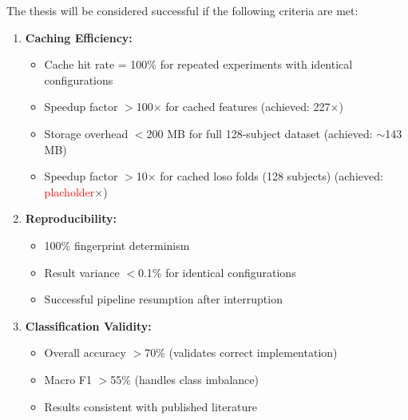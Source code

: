 The thesis will be considered successful if the following criteria are met:

\begin{enumerate}
\item \textbf{Caching Efficiency:}
  \begin{itemize}
  \item Cache hit rate = 100\% for repeated experiments with identical configurations
  \item Speedup factor $>$100$\times$ for cached features (achieved: 227$\times$)
  \item Storage overhead $<$200 MB for full 128-subject dataset (achieved: $\sim$143 MB)
    \item Speedup factor $>$10$\times$ for cached loso folds (128 subjects) (achieved: \textcolor{red}{placholder}$\times$)
  \end{itemize}

\item \textbf{Reproducibility:}
  \begin{itemize}
  \item 100\% fingerprint determinism
  \item Result variance $<$0.1\% for identical configurations
  \item Successful pipeline resumption after interruption
  \end{itemize}

\item \textbf{Classification Validity:}
  \begin{itemize}
  \item Overall accuracy $>$70\% (validates correct implementation)
  \item Macro F1 $>$55\% (handles class imbalance)
  \item Results consistent with published literature
  \end{itemize}
\end{enumerate}

